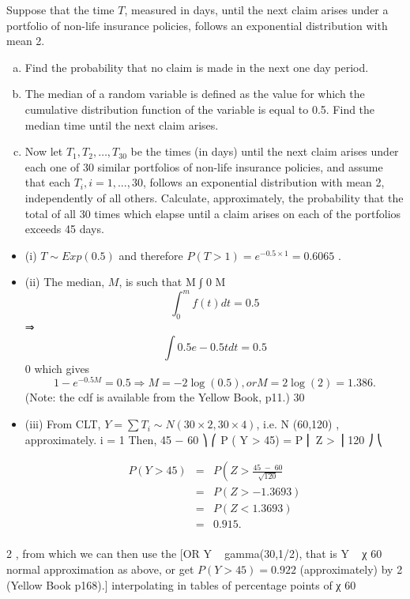 \documentclass[a4paper,12pt]{article}
\begin{document}
Suppose that the time $T$, measured in days, until the next claim arises under a portfolio of non-life insurance policies, follows an exponential distribution with mean 2.

\begin{enumerate}[(a)]
\item Find the probability that no claim is made in the next one day period.
\item The median of a random variable is defined as the value for which the cumulative distribution function of the variable is equal to 0.5. Find the median time until the next claim arises.
\item 
Now let $T_1 , T_2 , \ldots , T_{30}$ be the times (in days) until the next claim arises under each one of 30 similar portfolios of non-life insurance policies, and assume that each $T_i , i = 1,...,30$, follows an exponential distribution with mean 2,
independently of all others.
Calculate, approximately, the probability that the total of all 30 times which elapse until a claim arises on each of the portfolios exceeds 45 days.
\end{enumerate}

\begin{itemize}
\item (i) $T \sim Exp(0.5)$ and therefore $P ( T > 1) = e^{ − 0.5 \times 1} = 0.6065$ .
\item (ii) The median, $M$, is such that
M
∫
0
M
\[\int^{m}_{0} f ( t ) dt = 0.5\] ⇒ \[\int 0.5 e − 0.5 t dt = 0.5\]
0
which gives
\[1 − e^{ − 0.5 M} = 0.5 ⇒ M = − 2 \log(0.5) , or M = 2 \log(2) = 1.386 .\]
(Note: the cdf is available from the Yellow Book, p11.)
30
\item (iii)
From CLT, $Y =\sum T_i \sim N (30 \times 2, 30 \times 4)$, i.e. N (60,120) , approximately.
i = 1
Then,
45 − 60 ⎞
⎛
P ( Y > 45) = P ⎜ Z >
⎟ 
120 ⎠
⎝

\begin{eqnarray*}
P ( Y > 45) &=& P \left( Z > \frac{45 \;-\; 60}{\sqrt{120} }\\
&=& P ( Z > − 1.3693) \\
&=& P ( Z < 1.3693) \\
&=& 0.915.\\
\end{eqnarray*}

\end{itemize}
2
, from which we can then use the
[OR Y ~ gamma(30,1/2), that is Y ~ χ 60
normal approximation as above, or get $P(Y > 45) = 0.922$ (approximately) by 2
(Yellow Book p168).]
interpolating in tables of percentage points of χ 60
\end{document}
